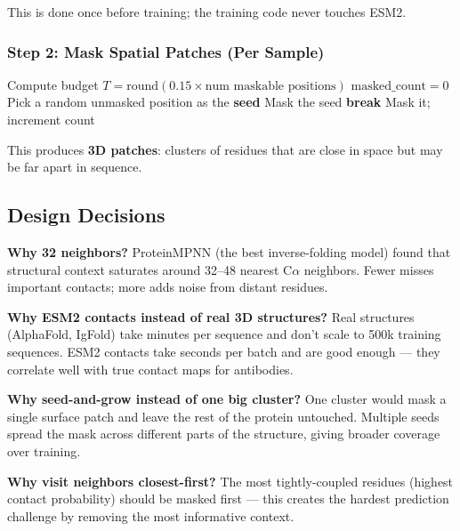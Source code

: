 \documentclass[11pt]{article}
\begin{document}
This is done once before training; the training code never touches
ESM2.

\subsubsection{Step 2: Mask Spatial Patches (Per Sample)}
\begin{algorithm}[H]
\caption{Structure Masking: Seed-and-Grow}
\begin{algorithmic}[1]
\State Compute budget $T = \text{round}(0.15 \times \text{num maskable positions})$
\State $\text{masked\_count} = 0$
    \State Pick a random unmasked position as the \textbf{seed}
    \State Mask the seed
         \textbf{break} \EndIf
            \State Mask it; increment count
        \EndIf
    \EndFor
\EndWhile
\end{algorithmic}
\end{algorithm}

This produces \textbf{3D patches}: clusters of residues that are
close in space but may be far apart in sequence.

\subsection{Design Decisions}

\textbf{Why 32 neighbors?}
ProteinMPNN (the best inverse-folding model) found that structural
context saturates around 32--48 nearest C$\alpha$ neighbors. Fewer
misses important contacts; more adds noise from distant residues.

\textbf{Why ESM2 contacts instead of real 3D structures?}
Real structures (AlphaFold, IgFold) take minutes per sequence and
don't scale to 500k training sequences. ESM2 contacts take seconds
per batch and are good enough --- they correlate well with true
contact maps for antibodies.

\textbf{Why seed-and-grow instead of one big cluster?}
One cluster would mask a single surface patch and leave the rest
of the protein untouched. Multiple seeds spread the mask across
different parts of the structure, giving broader coverage over
training.

\textbf{Why visit neighbors closest-first?}
The most tightly-coupled residues (highest contact probability)
should be masked first --- this creates the hardest prediction
challenge by removing the most informative context.
\end{document}
